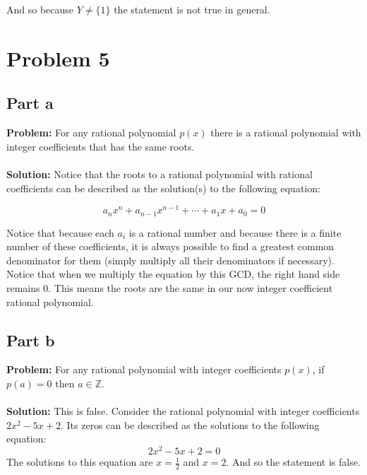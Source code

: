 \documentclass{article}
\begin{document}
And so because $Y\not=\{1\}$ the statement is not true in general.

\section*{Problem 5}
\subsection*{Part a}
\textbf{Problem:} For any rational polynomial $p(x)$ there is a rational polynomial with integer coefficients that has the same roots.
\\\\
\textbf{Solution:} Notice that the roots to a rational polynomial with rational coefficients can be described as the solution(s) to the following equation:

$$a_nx^n+a_{n-1}x^{n-1}+\cdots+a_1x+a_0=0$$

Notice that because each $a_i$ is a rational number and because there is a finite number of these coefficients, it is always possible to find a greatest common denominator for them (simply multiply all their denominators if necessary). Notice that when we multiply the equation by this GCD, the right hand side remains 0. This means the roots are the same in our now integer coefficient rational polynomial.

\subsection*{Part b}
\textbf{Problem:} For any rational polynomial with integer coefficients $p(x)$, if $p(a)=0$ then $a\in\mathbb Z$.
\\\\
\textbf{Solution:} This is false. Consider the rational polynomial with integer coefficients $2x^2-5x+2$. Its zeros can be described as the solutions to the following equation:
$$2x^2-5x+2=0$$
The solutions to this equation are $x=\frac{1}{2}$ and $x=2$. And so the statement is false.
\end{document}
